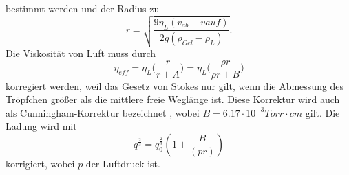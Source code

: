 bestimmt werden und der Radius zu
\begin{equation}
    r = \sqrt{\frac{9 \eta_L (v_{ab}-v{auf})}{2 g (\rho_{Oel}-\rho_L)}}.
    \label{eqn:Radius}
\end{equation}
Die Viskosität von Luft muss durch 
\begin{equation}
    \eta_{eff} = \eta_L \Biggl(\frac{r}{r + A}\Biggr) = \eta_L \Biggl(\frac{\rho r}{\rho r + B}\Biggr)
    \label{eqn:eta_kor}
\end{equation}
korregiert werden, weil das Gesetz von Stokes nur gilt, wenn die Abmessung des Tröpfchen größer als die mittlere
freie Weglänge ist. Diese Korrektur wird auch als Cunningham-Korrektur bezeichnet , wobei $B = 6.17 \cdot 10^{-3} Torr \cdot cm$ gilt.
Die Ladung wird mit 
\begin{equation}
    q^{\frac{2}{3}} = q^{\frac{2}{3}}_0 (1 + \frac{B}{(p r)})
    \label{eqn:Ladung_kor}
\end{equation}
korrigiert, wobei $p$ der Luftdruck ist.